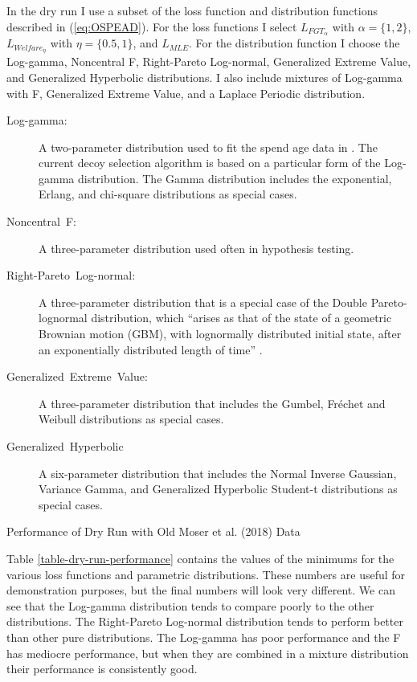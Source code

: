\documentclass[english]{article}
\begin{document}
In the dry run I use a subset of the loss function and distribution
functions described in (\ref{eq:OSPEAD}). For the loss functions
I select $L_{FGT_{\alpha}}$ with $\alpha=\{1,2\}$, $L_{Welfare_{\eta}}$
with $\eta=\{0.5,1\}$, and $L_{MLE}$. For the distribution function
I choose the Log-gamma, Noncentral F, Right-Pareto Log-normal, Generalized
Extreme Value, and Generalized Hyperbolic distributions. I also include
mixtures of Log-gamma with F, Generalized Extreme Value, and a Laplace
Periodic distribution.
\begin{description}
\item [{Log-gamma:}] A two-parameter distribution used to fit the spend
age data in \cite{2018}. The current decoy selection algorithm is
based on a particular form of the Log-gamma distribution. The Gamma
distribution includes the exponential, Erlang, and chi-square distributions
as special cases.
\item [{Noncentral~F:}] A three-parameter distribution used often in hypothesis
testing.
\item [{Right-Pareto~Log-normal:}] A three-parameter distribution that
is a special case of the Double Pareto-lognormal distribution, which
``arises as that of the state of a geometric Brownian motion (GBM),
with lognormally distributed initial state, after an exponentially
distributed length of time'' \cite{ReedJorgensen2004}.
\item [{Generalized~Extreme~Value:}] A three-parameter distribution that
includes the Gumbel, Fr{\'e}chet and Weibull distributions as special
cases.
\item [{Generalized~Hyperbolic}] A six-parameter distribution that includes
the Normal Inverse Gaussian, Variance Gamma, and Generalized Hyperbolic
Student-t distributions as special cases.
\end{description}
\begin{table}[H]
\caption{Performance of Dry Run with Old M{\:o}ser et al. (2018) Data}



\label{table-dry-run-performance}
\end{table}

Table \ref{table-dry-run-performance} contains the values of the
minimums for the various loss functions and parametric distributions.
These numbers are useful for demonstration purposes, but the final
numbers will look very different. We can see that the Log-gamma distribution
tends to compare poorly to the other distributions. The Right-Pareto
Log-normal distribution tends to perform better than other pure distributions.
The Log-gamma has poor performance and the F has mediocre performance,
but when they are combined in a mixture distribution their performance
is consistently good.
\end{document}
